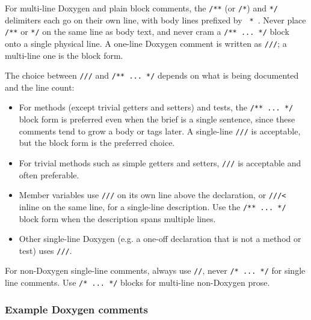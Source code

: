 For multi-line Doxygen and plain block comments, the \texttt{/**} (or \texttt{/*}) and \texttt{*/} delimiters each go on their own line, with body lines prefixed by \texttt{ * }. Never place \texttt{/**} or \texttt{*/} on the same line as body text, and never cram a \texttt{/** ... */} block onto a single physical line. A one-line Doxygen comment is written as \texttt{///}; a multi-line one is the block form.

The choice between \texttt{///} and \texttt{/** ... */} depends on what is being documented and the line count:
\begin{itemize}\itemsep0em
    \item For methods (except trivial getters and setters) and tests, the \texttt{/** ... */} block form is preferred even when the brief is a single sentence, since these comments tend to grow a body or tags later. A single-line \texttt{///} is acceptable, but the block form is the preferred choice.
    \item For trivial methods such as simple getters and setters, \texttt{///} is acceptable and often preferable.
    \item Member variables use \texttt{///} on its own line above the declaration, or \texttt{///<} inline on the same line, for a single-line description. Use the \texttt{/** ... */} block form when the description spans multiple lines.
    \item Other single-line Doxygen (e.g. a one-off declaration that is not a method or test) uses \texttt{///}.
\end{itemize}
For non-Doxygen single-line comments, always use \texttt{//}, never \texttt{/* ... */} for single line comments. Use \texttt{/* ... */} blocks for multi-line non-Doxygen prose.

\subsubsection*{Example Doxygen comments}

